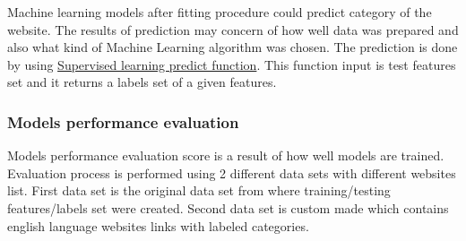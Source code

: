Machine learning models after fitting procedure could predict category of the website. The results of prediction may concern of how well data was prepared and also what kind of Machine Learning algorithm was chosen. The prediction is done by using \href{https://scikit-learn.org/stable/tutorial/statistical_inference/supervised_learning.html}{Supervised learning predict function}. This function input is test features set and it returns a labels set of a given features. 

\subsubsection{Models performance evaluation}

Models performance evaluation score is a result of how well models are trained. Evaluation process is performed using 2 different data sets with different websites list. First data set is the original data set from where training/testing features/labels set were created. Second data set is custom made which contains english language websites links with labeled categories.

